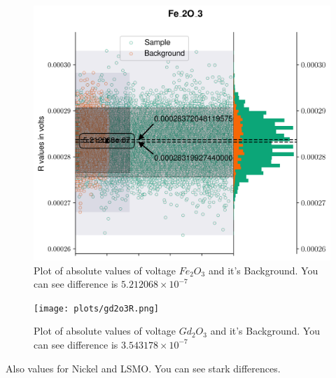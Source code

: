\begin{figure}[hbt!]
  \includegraphics[width= \linewidth]{plots/fe2o3R.png}
  \caption{Plot of absolute values of voltage $Fe_2O_3$ and it's Background. You can see difference is $5.212068 \times 10^{-7}$}
  \label{fig:Rdata1}
\end{figure}
\begin{figure}[hbt!]
  \texttt{[image: plots/gd2o3R.png]}
  \caption{Plot of absolute values of voltage $Gd_2O_3$ and it's Background. You can see difference is $3.543178 \times 10^{-7}$}
  \label{fig:Rdata2}
\end{figure}

Also values for Nickel and LSMO. You can see stark differences.

